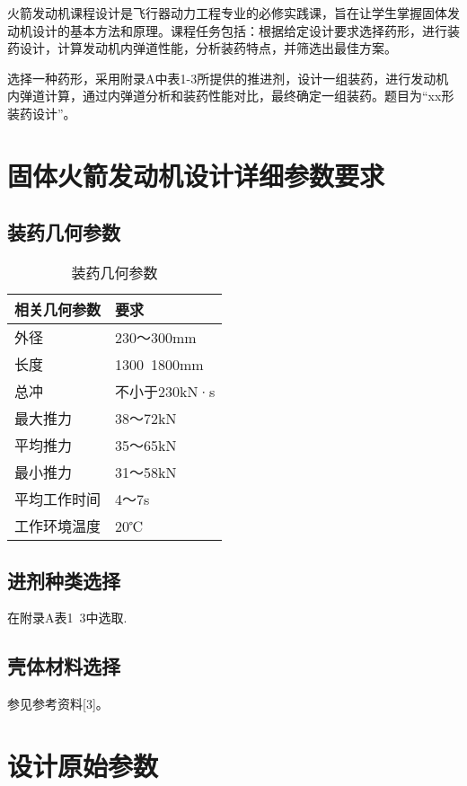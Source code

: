 火箭发动机课程设计是飞行器动力工程专业的必修实践课，旨在让学生掌握固体发动机设计的基本方法和原理。课程任务包括：根据给定设计要求选择药形，进行装药设计，计算发动机内弹道性能，分析装药特点，并筛选出最佳方案。

选择一种药形，采用附录A中表1-3所提供的推进剂，设计一组装药，进行发动机内弹道计算，通过内弹道分析和装药性能对比，最终确定一组装药。题目为“xx形装药设计”。

\section{固体火箭发动机设计详细参数要求}

\subsection{装药几何参数}

\begin{table}
  \centering
  \caption{装药几何参数}
  \begin{tabular}{ll}
    \toprule
    相关几何参数          & 要求                         \\
    \midrule
    外径   & 230～300mm \\
    长度   & 1300~1800mm                     \\
    总冲   & 不小于230kN·s    \\
    最大推力   & 38～72kN    \\
    平均推力   & 35～65kN    \\
    最小推力   & 31～58kN    \\
    平均工作时间   & 4～7s    \\
    工作环境温度   & 20℃    \\

    \bottomrule
  \end{tabular}
  \label{tab:three-line}
\end{table}

\subsection{进剂种类选择}

在附录A表1~3中选取.

\subsection{壳体材料选择}

参见参考资料[3]。

\section{设计原始参数}

